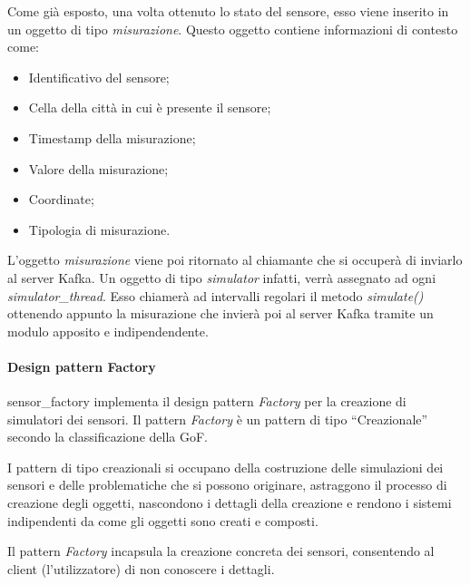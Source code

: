 Come già esposto, una volta ottenuto lo stato del sensore, esso viene inserito in un oggetto di tipo \textit{misurazione}. Questo oggetto contiene informazioni di contesto come:
\begin{itemize}
    \item Identificativo del sensore;
    \item Cella della città in cui è presente il sensore;
    \item Timestamp della misurazione;
    \item Valore della misurazione;
    \item Coordinate;
    \item Tipologia di misurazione.
\end{itemize}

L'oggetto \textit{misurazione} viene poi ritornato al chiamante che si occuperà di inviarlo al server Kafka.
Un oggetto di tipo \textit{simulator} infatti, verrà assegnato ad ogni \textit{simulator\_thread}. Esso chiamerà ad intervalli regolari il metodo \textit{simulate()} ottenendo appunto la misurazione che invierà poi al server Kafka tramite un modulo apposito e indipendendente.

\paragraph{Design pattern Factory}
sensor\_factory implementa il design pattern \textit{Factory} per la creazione di simulatori dei sensori.
Il pattern \textit{Factory} è un pattern di tipo “Creazionale” secondo la classificazione della GoF.

I pattern di tipo creazionali si occupano della costruzione delle simulazioni dei sensori e delle problematiche che si possono originare, astraggono il processo di creazione degli oggetti, nascondono i dettagli della creazione e rendono i sistemi indipendenti da come gli oggetti sono creati e composti.

Il pattern \textit{Factory} incapsula la creazione concreta dei sensori, consentendo al client
(l’utilizzatore) di non conoscere i dettagli.

